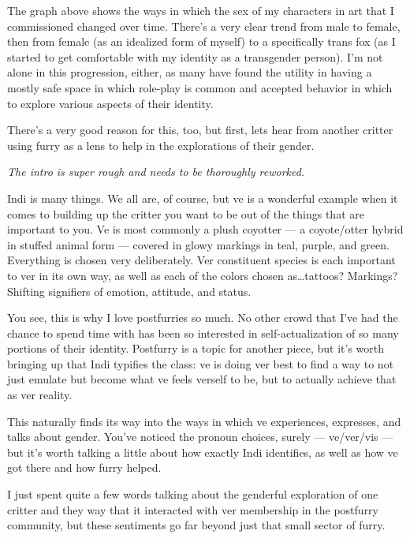 The graph above shows the ways in which the sex of my characters in art that I commissioned changed over time.  There's a very clear trend from male to female, then from female (as an idealized form of myself) to a specifically trans fox (as I started to get comfortable with my identity as a transgender person).  I'm not alone in this progression, either, as many have found the utility in having a mostly safe space in which role-play is common and accepted behavior in which to explore various aspects of their identity.

There's a very good reason for this, too, but first, lets hear from another critter using furry as a lens to help in the explorations of their gender.

\secdiv

\begin{center}
  \textit{The intro is super rough and needs to be thoroughly reworked.}
\end{center}

Indi is many things.  We all are, of course, but ve is a wonderful example when it comes to building up the critter you want to be out of the things that are important to you.  Ve is most commonly a plush coyotter --- a coyote/otter hybrid in stuffed animal form --- covered in glowy markings in teal, purple, and green. Everything is chosen very deliberately.  Ver constituent species is each important to ver in its own way, as well as each of the colors chosen as\ldots{}tattoos?  Markings?  Shifting signifiers of emotion, attitude, and status.

You see, this is why I love postfurries so much.  No other crowd that I've had the chance to spend time with has been so interested in self-actualization of so many portions of their identity.  Postfurry is a topic for another piece, but it's worth bringing up that Indi typifies the class: ve is doing ver best to find a way to not just emulate but become what ve feels verself to be, but to actually achieve that as ver reality.

This naturally finds its way into the ways in which ve experiences, expresses, and talks about gender.  You've noticed the pronoun choices, surely --- ve/ver/vis --- but it's worth talking a little about how exactly Indi identifies, as well as how ve got there and how furry helped.

\secdiv

I just spent quite a few words talking about the genderful exploration of one critter and they way that it interacted with ver membership in the postfurry community, but these sentiments go far beyond just that small sector of furry.

